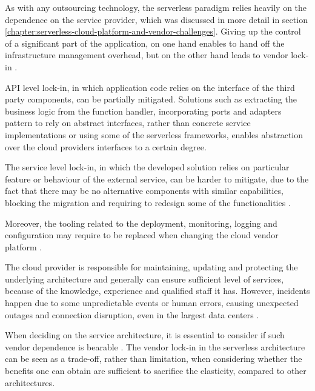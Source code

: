 As with any outsourcing technology, the serverless paradigm relies heavily on the dependence on the service provider, which was discussed in more detail in section \ref{chapter:serverless-cloud-platform-and-vendor-challenges}.
Giving up the control of a significant part of the application, on one hand enables to hand off the infrastructure management overhead, but on the other hand leads to vendor lock-in \cite{MartinFowlerServerless}.

API level lock-in, in which application code relies on the interface of the third party components, can be partially mitigated.
Solutions such as extracting the business logic from the function handler, incorporating ports and adapters pattern to rely on abstract interfaces, rather than concrete service implementations or using some of the serverless frameworks, enables abstraction over the cloud providers interfaces to a certain degree.

The service level lock-in, in which the developed solution relies on particular feature or behaviour of the external service, can be harder to mitigate, due to the fact that there may be no alternative components with similar capabilities, blocking the migration and requiring to redesign some of the functionalities \cite{EvaluationOfServerlessApplicationProgrammingModel}.

Moreover, the tooling related to the deployment, monitoring, logging and configuration may require to be replaced when changing the cloud vendor platform \cite{MartinFowlerServerless}.

The cloud provider is responsible for maintaining, updating and protecting the underlying architecture and generally can ensure sufficient level of services, because of the knowledge, experience and qualified staff it has. However, incidents happen due to some unpredictable events or human errors, causing unexpected outages and connection disruption, even in the largest data centers \cite{EvaluationOfServerlessApplicationProgrammingModel}.

When deciding on the service architecture, it is essential to consider if such vendor dependence is bearable \cite{LeveragingServerlessCloudComputingArchitectures}.
The vendor lock-in in the serverless architecture can be seen as a trade-off, rather than limitation, when considering whether the benefits one can obtain are sufficient to sacrifice the elasticity, compared to other architectures.



